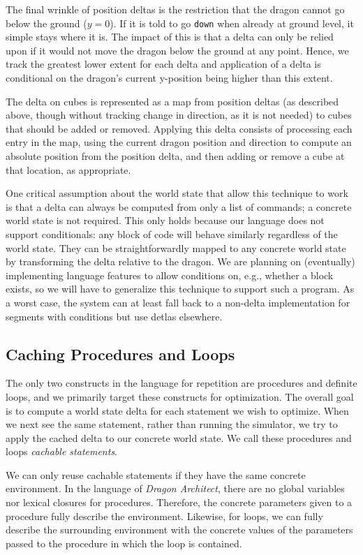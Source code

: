 \documentclass{sig-alternate}
\newcommand{\da}{\emph{Dragon Architect}}
\begin{document}
The final wrinkle of position deltas is the restriction that the dragon cannot go below the ground ($y=0$). If it is told to go \texttt{down} when already at ground level, it simple stays where it is. The impact of this is that a delta can only be relied upon if it would not move the dragon below the ground at any point. Hence, we track the greatest lower extent for each delta and application of a delta is conditional on the dragon's current y-position being higher than this extent. 

The delta on cubes is represented as a map from position deltas (as described above, though without tracking change in direction, as it is not needed) to cubes that should be added or removed. Applying this delta consists of processing each entry in the map, using the current dragon position and direction to compute an absolute position from the position delta, and then adding or remove a cube at that location, as appropriate.

One critical assumption about the world state that allow this technique to work is that a delta can always be computed from only a list of commands; a concrete world state is not required. This only holds because our language does not support conditionals: any block of code will behave similarly regardless of the world state. They can be straightforwardly mapped to any concrete world state by transforming the delta relative to the dragon. We are planning on (eventually) implementing language features to allow conditions on, e.g., whether a block exists, so we will have to generalize this technique to support such a program. As a worst case, the system can at least fall back to a non-delta implementation for segments with conditions but use detlas elsewhere.

\subsection{Caching Procedures and Loops}

The only two constructs in the language for repetition are procedures and definite loops, and we primarily target these constructs for optimization. The overall goal is to compute a world state delta for each statement we wish to optimize. When we next see the same statement, rather than running the simulator, we try to apply the cached delta to our concrete world state. We call these procedures and loops \emph{cachable statements}.

We can only reuse cachable statements if they have the same concrete environment. In the language of \da{}, there are no global variables nor lexical closures for procedures. Therefore, the concrete parameters given to a procedure fully describe the environment. Likewise, for loops, we can fully describe the surrounding environment with the concrete values of the parameters passed to the procedure in which the loop is contained.
\end{document}
